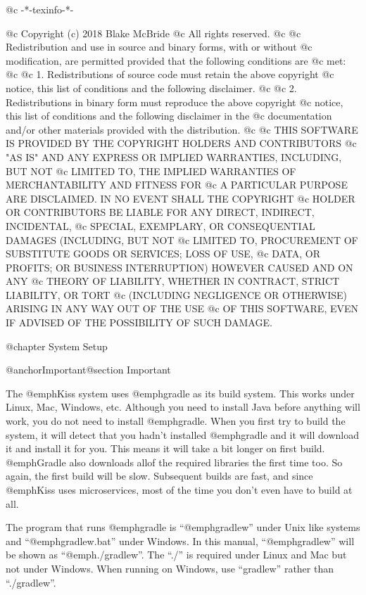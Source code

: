 @c -*-texinfo-*-

@c  Copyright (c) 2018 Blake McBride
@c  All rights reserved.
@c
@c  Redistribution and use in source and binary forms, with or without
@c  modification, are permitted provided that the following conditions are
@c  met:
@c
@c  1. Redistributions of source code must retain the above copyright
@c  notice, this list of conditions and the following disclaimer.
@c
@c  2. Redistributions in binary form must reproduce the above copyright
@c  notice, this list of conditions and the following disclaimer in the
@c  documentation and/or other materials provided with the distribution.
@c
@c  THIS SOFTWARE IS PROVIDED BY THE COPYRIGHT HOLDERS AND CONTRIBUTORS
@c  "AS IS" AND ANY EXPRESS OR IMPLIED WARRANTIES, INCLUDING, BUT NOT
@c  LIMITED TO, THE IMPLIED WARRANTIES OF MERCHANTABILITY AND FITNESS FOR
@c  A PARTICULAR PURPOSE ARE DISCLAIMED. IN NO EVENT SHALL THE COPYRIGHT
@c  HOLDER OR CONTRIBUTORS BE LIABLE FOR ANY DIRECT, INDIRECT, INCIDENTAL,
@c  SPECIAL, EXEMPLARY, OR CONSEQUENTIAL DAMAGES (INCLUDING, BUT NOT
@c  LIMITED TO, PROCUREMENT OF SUBSTITUTE GOODS OR SERVICES; LOSS OF USE,
@c  DATA, OR PROFITS; OR BUSINESS INTERRUPTION) HOWEVER CAUSED AND ON ANY
@c  THEORY OF LIABILITY, WHETHER IN CONTRACT, STRICT LIABILITY, OR TORT
@c  (INCLUDING NEGLIGENCE OR OTHERWISE) ARISING IN ANY WAY OUT OF THE USE
@c  OF THIS SOFTWARE, EVEN IF ADVISED OF THE POSSIBILITY OF SUCH DAMAGE.


@chapter System Setup

@anchor{Important}@section Important

The @emph{Kiss} system uses @emph{gradle} as its build system.  This
works under Linux, Mac, Windows, etc.  Although you need to install
Java before anything will work, you do not need to install
@emph{gradle}.  When you first try to build the system, it will detect
that you hadn't installed @emph{gradle} and it will download it and
install it for you.  This means it will take a bit longer on first
build.  @emph{Gradle} also downloads allof the required libraries the
first time too.  So again, the first build will be slow.  Subsequent
builds are fast, and since @emph{Kiss} uses microservices, most of the
time you don't even have to build at all.

The program that runs @emph{gradle} is ``@emph{gradlew}'' under Unix like
systems and ``@emph{gradlew.bat}'' under Windows.  In this manual,
``@emph{gradlew}'' will be shown as ``@emph{./gradlew}''.  The ``./'' is
required under Linux and Mac but not under Windows.  When running on
Windows, use ``gradlew'' rather than ``./gradlew''.



